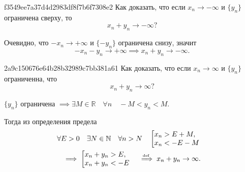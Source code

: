    \begin{note}{f3549ee7a37d4d2983df8f7b6f7308e2}
        Как доказать, что если \( x_n \to -\infty \) и \( \{ y_n \} \) ограничена сверху, то \[
            x_n + y_n \to -\infty?
        \]

        \begin{cloze}{1}
            Очевидно, что \( -x_n \to +\infty  \) и \( \{ -y_n \} \)  ограничена снизу, значит \[
                -x_n - y_n \to +\infty \implies x_n + y_n \to -\infty.
            \]
        \end{cloze}
    \end{note}

    \begin{note}{2a9c150676e64b28b32989c7bb381a61}
        Как доказать, что если \( x_n \to \infty  \) и \( \{ y_n \} \) ограниченна, что \[
            x_n + y_n \to \infty?
        \]

        \begin{cloze}{1}
            \( \{ y_n \} \) ограничена \( \implies \exists M \in \mathbb R \quad \forall n \quad -M < y_n < M. \)

            Тогда из определения предела
            \begin{multline*}
                \forall E > 0 \quad \exists N \in \mathbb N \quad \forall n > N \quad \left[ {
                    \begin{array}{@{}l@{\quad}l@{}}
                        x_n > E + M, \\
                        x_n < -E - M
                    \end{array}
                } \right. \\
                \implies \left[ {
                    \begin{array}{@{}l@{\quad}l@{}}
                        x_n + y_n > E, \\
                        x_n + y_n < -E
                    \end{array}
                } \right.
                \overset{\!\!\text{\tiny def}}\implies x_n + y_n \to \infty.
            \end{multline*}
        \end{cloze}
    \end{note}

